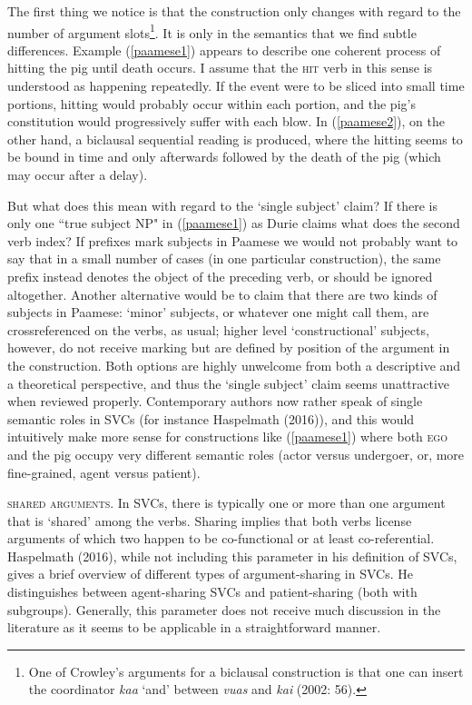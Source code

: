 The first thing we notice is that the construction only changes with regard to the number of argument slots\footnote{One of Crowley's arguments for a biclausal construction is that one can insert the coordinator \textit{kaa} `and' between \textit{vuas} and \textit{kai} (2002: 56).}. It is only in the semantics that we find subtle differences. Example (\ref{paamese1}) appears to describe one coherent process of hitting the pig until death occurs. I assume that the \textsc{hit} verb in this sense is understood as happening repeatedly. If the event were to be sliced into small time portions, hitting would probably occur within each portion, and the pig's constitution would progressively suffer with each blow. In (\ref{paamese2}), on the other hand, a biclausal sequential reading is produced, where the hitting seems to be bound in time and only afterwards followed by the death of the pig (which may occur after a delay). 

But what does this mean with regard to the `single subject' claim? If there is only one ``true subject NP" in (\ref{paamese1}) as Durie claims what does the second verb index? If prefixes mark subjects in Paamese we would not probably want to say that in a small number of cases (in one particular construction), the same prefix instead denotes the object of the preceding verb, or should be ignored altogether. Another alternative would be to claim that there are two kinds of subjects in Paamese: `minor' subjects, or whatever one might call them, are crossreferenced on the verbs, as usual; higher level `constructional' subjects, however, do not receive marking but are defined by  position of the argument in the construction. Both options are highly unwelcome from both a descriptive and a theoretical perspective, and thus the `single subject' claim seems unattractive when reviewed properly. Contemporary authors now rather speak of single semantic roles in SVCs (for instance Haspelmath (2016)), and this would intuitively make more sense for constructions like (\ref{paamese1}) where both \textsc{ego} and the pig occupy very different semantic roles (actor versus undergoer, or, more fine-grained, agent versus patient).

\textsc{shared arguments}. In SVCs, there is typically one or more than one argument that is `shared' among the verbs. Sharing implies that both verbs license arguments of which two happen to be co-functional or at least co-referential. Haspelmath (2016), while not including this parameter in his definition of SVCs, gives a brief overview of different types of argument-sharing in SVCs. He distinguishes between agent-sharing SVCs and patient-sharing (both with subgroups). Generally, this parameter does not receive much discussion in the literature as it seems to be applicable in a straightforward manner.

